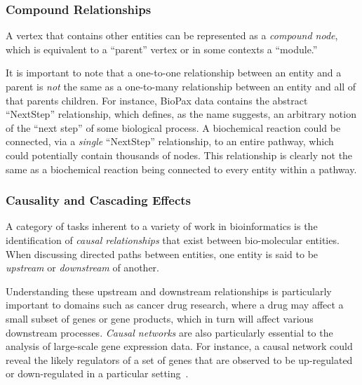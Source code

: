 \documentclass[journal]{vgtc}                %
\begin{document}
\subsubsection{Compound Relationships}

A vertex that contains other entities can be represented as a \textit{compound node}, which is equivalent to a ``parent'' vertex or in some contexts a ``module.''

It is important to note that a one-to-one relationship between an entity and a parent is \textit{not} the same as a one-to-many relationship between an entity and all of that parents children.
For instance, BioPax data contains the abstract ``NextStep'' relationship, which defines, as the name suggests, an arbitrary notion of the ``next step'' of some biological process.
A biochemical reaction could be connected, via a \textit{single} ``NextStep'' relationship, to an entire pathway, which could potentially contain thousands of nodes.
This relationship is clearly not the same as a biochemical reaction being connected to every entity within a pathway.

\subsubsection{Causality and Cascading Effects}



A category of tasks inherent to a variety of work in bioinformatics is the identification of \textit{causal relationships} that exist between bio-molecular entities.
When discussing directed paths between entities, one entity is said to be \emph{upstream} or \emph{downstream} of another.

Understanding these upstream and downstream relationships is particularly important to domains such as cancer drug research, where a drug may affect a small subset of genes or gene products, which in turn will affect various downstream processes.
\emph{Causal networks} are also particularly essential to the analysis of large-scale gene expression data.
For instance, a causal network could reveal the likely regulators of a set of genes that are observed to be up-regulated or down-regulated in a particular setting~\cite{felciano2013predictive, Kramer2013ipa-causal}.
\end{document}
